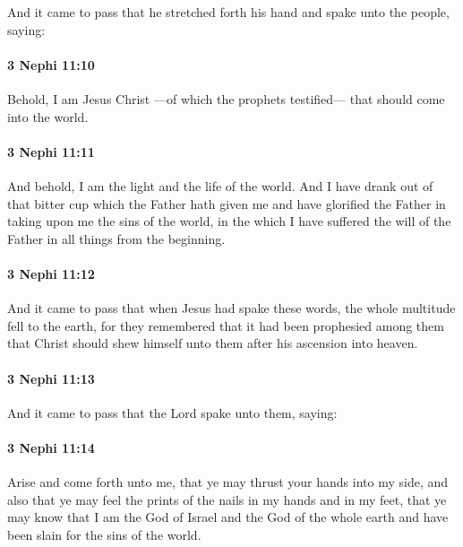 			And it came to pass that he stretched forth his hand
			and spake unto the people, saying:

		\paragraph{3 Nephi 11:10} %
			\label{3NEPHI-11-10}

			Behold, I am Jesus Christ
			---of which the prophets testified---
			that should come into the world.

		\paragraph{3 Nephi 11:11} %
			\label{3NEPHI-11-11}

			And behold, I am the light and the life of the world.
			And I have drank out of that bitter cup which the Father hath given me
			and have glorified the Father in taking upon me the sins of the world,
			in the which I have suffered the will of the Father in all things from the beginning.

		\paragraph{3 Nephi 11:12} %
			\label{3NEPHI-11-12}

			And it came to pass that when Jesus had spake these words,
			the whole multitude fell to the earth,
			for they remembered that it had been prophesied among them
			that Christ should shew himself unto them after his ascension into heaven.

		\paragraph{3 Nephi 11:13} %
			\label{3NEPHI-11-13}

			And it came to pass that the Lord spake unto them, saying:

		\paragraph{3 Nephi 11:14} %
			\label{3NEPHI-11-14}

			Arise and come forth unto me,
			that ye may thrust your hands into my side,
			and also that ye may feel the prints of the nails in my hands and in my feet,
			that ye may know that I am the God of Israel and the God of the whole earth
			and have been slain for the sins of the world.

